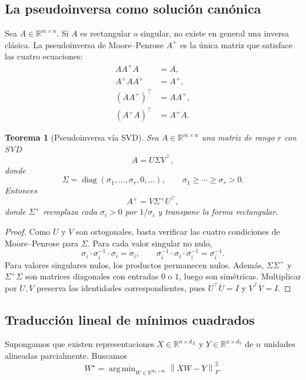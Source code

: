 \documentclass[11pt,a4paper]{article}
\newtheorem{theorem}{Teorema}[section]
\DeclareMathOperator*{\argmin}{arg\,min}
\DeclareMathOperator{\diag}{diag}
\newcommand{\R}{\mathbb{R}}
\newcommand{\1}{\mathbf{1}}
\newcommand{\norm}[1]{\left\lVert #1 \right\rVert}
\numberwithin{equation}{section}
\begin{document}
\subsection{La pseudoinversa como solución canónica}

Sea \(A\in\R^{m\times n}\). Si \(A\) es rectangular o singular, no existe en general una inversa clásica. La pseudoinversa de Moore--Penrose \(A^+\) es la única matriz que satisface las cuatro ecuaciones:
\begin{align}
    A A^+ A &= A,\\
    A^+ A A^+ &= A^+,\\
    (A A^+)^\top &= A A^+,\\
    (A^+ A)^\top &= A^+ A.
\end{align}

\begin{theorem}[Pseudoinversa vía SVD]
Sea \(A\in\R^{m\times n}\) una matriz de rango \(r\) con SVD
\begin{equation}
    A=U\Sigma V^\top,
\end{equation}
donde
\[
    \Sigma=\diag(\sigma_1,\dots,\sigma_r,0,\dots),
    \qquad
    \sigma_1\geq \cdots \geq \sigma_r>0.
\]
Entonces
\begin{equation}
    A^+=V\Sigma^+U^\top,
    \label{eq:mp_svd}
\end{equation}
donde \(\Sigma^+\) reemplaza cada \(\sigma_i>0\) por \(1/\sigma_i\) y transpone la forma rectangular.
\end{theorem}

\begin{proof}
Como \(U\) y \(V\) son ortogonales, basta verificar las cuatro condiciones de Moore--Penrose para \(\Sigma\). Para cada valor singular no nulo,
\[
    \sigma_i \cdot \sigma_i^{-1}\cdot \sigma_i=\sigma_i,
    \qquad
    \sigma_i^{-1}\cdot \sigma_i\cdot \sigma_i^{-1}=\sigma_i^{-1}.
\]
Para valores singulares nulos, los productos permanecen nulos. Además, \(\Sigma\Sigma^+\) y \(\Sigma^+\Sigma\) son matrices diagonales con entradas \(0\) o \(1\), luego son simétricas. Multiplicar por \(U,V\) preserva las identidades correspondientes, pues \(U^\top U=I\) y \(V^\top V=I\).
\end{proof}

\subsection{Traducción lineal de mínimos cuadrados}

Supongamos que existen representaciones \(X\in\R^{n\times d_X}\) y \(Y\in\R^{n\times d_Y}\) de \(n\) unidades alineadas parcialmente. Buscamos
\begin{equation}
    W^\star=\argmin_{W\in\R^{d_X\times d_Y}}
    \norm{XW-Y}_F^2.
    \label{eq:ls_translation}
\end{equation}
\end{document}
